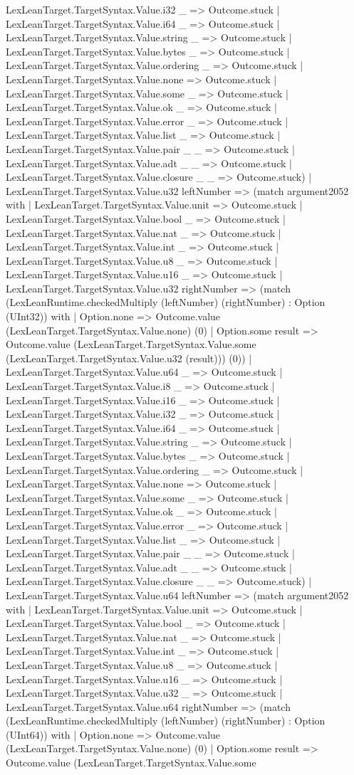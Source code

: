 \documentclass[11pt]{article}
\begin{document}
LexLeanTarget.TargetSyntax.Value.i32 \_ => Outcome.stuck | LexLeanTarget.TargetSyntax.Value.i64 \_ => Outcome.stuck | LexLeanTarget.TargetSyntax.Value.string \_ => Outcome.stuck | LexLeanTarget.TargetSyntax.Value.bytes \_ => Outcome.stuck | LexLeanTarget.TargetSyntax.Value.ordering \_ => Outcome.stuck | LexLeanTarget.TargetSyntax.Value.none => Outcome.stuck | LexLeanTarget.TargetSyntax.Value.some \_ => Outcome.stuck | LexLeanTarget.TargetSyntax.Value.ok \_ => Outcome.stuck | LexLeanTarget.TargetSyntax.Value.error \_ => Outcome.stuck | LexLeanTarget.TargetSyntax.Value.list \_ => Outcome.stuck | LexLeanTarget.TargetSyntax.Value.pair \_ \_ => Outcome.stuck | LexLeanTarget.TargetSyntax.Value.adt \_ \_ => Outcome.stuck | LexLeanTarget.TargetSyntax.Value.closure \_ \_ => Outcome.stuck) | LexLeanTarget.TargetSyntax.Value.u32 leftNumber => (match argument2052 with | LexLeanTarget.TargetSyntax.Value.unit => Outcome.stuck | LexLeanTarget.TargetSyntax.Value.bool \_ => Outcome.stuck | LexLeanTarget.TargetSyntax.Value.nat \_ => Outcome.stuck | LexLeanTarget.TargetSyntax.Value.int \_ => Outcome.stuck | LexLeanTarget.TargetSyntax.Value.u8 \_ => Outcome.stuck | LexLeanTarget.TargetSyntax.Value.u16 \_ => Outcome.stuck | LexLeanTarget.TargetSyntax.Value.u32 rightNumber => (match (LexLeanRuntime.checkedMultiply (leftNumber) (rightNumber) : Option (UInt32)) with | Option.none => Outcome.value (LexLeanTarget.TargetSyntax.Value.none) (0) | Option.some result => Outcome.value (LexLeanTarget.TargetSyntax.Value.some (LexLeanTarget.TargetSyntax.Value.u32 (result))) (0)) | LexLeanTarget.TargetSyntax.Value.u64 \_ => Outcome.stuck | LexLeanTarget.TargetSyntax.Value.i8 \_ => Outcome.stuck | LexLeanTarget.TargetSyntax.Value.i16 \_ => Outcome.stuck | LexLeanTarget.TargetSyntax.Value.i32 \_ => Outcome.stuck | LexLeanTarget.TargetSyntax.Value.i64 \_ => Outcome.stuck | LexLeanTarget.TargetSyntax.Value.string \_ => Outcome.stuck | LexLeanTarget.TargetSyntax.Value.bytes \_ => Outcome.stuck | LexLeanTarget.TargetSyntax.Value.ordering \_ => Outcome.stuck | LexLeanTarget.TargetSyntax.Value.none => Outcome.stuck | LexLeanTarget.TargetSyntax.Value.some \_ => Outcome.stuck | LexLeanTarget.TargetSyntax.Value.ok \_ => Outcome.stuck | LexLeanTarget.TargetSyntax.Value.error \_ => Outcome.stuck | LexLeanTarget.TargetSyntax.Value.list \_ => Outcome.stuck | LexLeanTarget.TargetSyntax.Value.pair \_ \_ => Outcome.stuck | LexLeanTarget.TargetSyntax.Value.adt \_ \_ => Outcome.stuck | LexLeanTarget.TargetSyntax.Value.closure \_ \_ => Outcome.stuck) | LexLeanTarget.TargetSyntax.Value.u64 leftNumber => (match argument2052 with | LexLeanTarget.TargetSyntax.Value.unit => Outcome.stuck | LexLeanTarget.TargetSyntax.Value.bool \_ => Outcome.stuck | LexLeanTarget.TargetSyntax.Value.nat \_ => Outcome.stuck | LexLeanTarget.TargetSyntax.Value.int \_ => Outcome.stuck | LexLeanTarget.TargetSyntax.Value.u8 \_ => Outcome.stuck | LexLeanTarget.TargetSyntax.Value.u16 \_ => Outcome.stuck | LexLeanTarget.TargetSyntax.Value.u32 \_ => Outcome.stuck | LexLeanTarget.TargetSyntax.Value.u64 rightNumber => (match (LexLeanRuntime.checkedMultiply (leftNumber) (rightNumber) : Option (UInt64)) with | Option.none => Outcome.value (LexLeanTarget.TargetSyntax.Value.none) (0) | Option.some result => Outcome.value (LexLeanTarget.TargetSyntax.Value.some 
\end{document}
